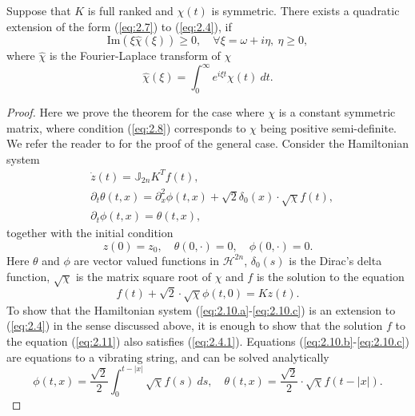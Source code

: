 \begin{theorem}
Suppose that $K$ is full ranked and $\chi(t)$ is symmetric. There exists a quadratic extension of the form (\ref{eq:2.7}) to (\ref{eq:2.4}), if
\begin{equation} \label{eq:2.8}
	\text{Im}(\xi\hat{\chi}(\xi)) \geq 0, \quad \forall \xi = \omega + i\eta, \ \eta \geq 0,
\end{equation}
where $\hat{\chi}$ is the Fourier-Laplace transform of $\chi$
\begin{equation} \label{eq:2.9}
	\hat{\chi}(\xi) = \int_0^\infty e^{i\xi t} \chi(t)\ dt.
\end{equation}
\end{theorem}

\begin{proof}
Here we prove the theorem for the case where $\chi$ is a constant symmetric matrix, where condition (\ref{eq:2.8}) corresponds to $\chi$ being positive semi-definite. We refer the reader to \cite{Figotin:2006jy} for the proof of the general case. Consider the Hamiltonian system
\begin{subequations}
\begin{align}
		\label{eq:2.10.a} & \dot{z}(t) = \mathbb J_{2n} K^T f(t), \\
		\label{eq:2.10.b} & \partial_t \theta(t,x) = \partial_x^2 \phi(t,x) + \sqrt 2 \delta_0(x) \cdot \sqrt{\chi}  f(t), \\
		\label{eq:2.10.c} & \partial_t \phi(t,x) = \theta(t,x),
\end{align}
\end{subequations}
together with the initial condition
\begin{equation} \label{eq:2.10.1}
	z(0) = z_0,\quad \theta(0,\cdot) = 0, \quad \phi(0,\cdot) = 0.
\end{equation}
Here $\theta$ and $\phi$ are vector valued functions in $\mathcal H^{2n}$, $\delta_0(s)$ is the Dirac's delta function, $\sqrt{ \chi}$ is the matrix square root of $\chi$ and $f$ is the solution to the equation
\begin{equation} \label{eq:2.11}
	f(t) + \sqrt{2} \cdot \sqrt{ \chi } \phi(t,0) = Kz(t).
\end{equation}
To show that the Hamiltonian system (\ref{eq:2.10.a}-\ref{eq:2.10.c}) is an extension to (\ref{eq:2.4}) in the sense discussed above, it is enough to show that the solution $f$ to the equation (\ref{eq:2.11}) also satisfies (\ref{eq:2.4.1}). Equations (\ref{eq:2.10.b}-\ref{eq:2.10.c}) are equations to a vibrating string, and can be solved analytically
\begin{equation} \label{eq:2.12}
	\phi(t,x) = \frac {\sqrt 2} 2 \int_0^{t-|x|} \sqrt{\chi} f(s)\ ds,\quad \theta(t,x) = \frac{\sqrt 2}{2} \cdot \sqrt{\chi} f(t - |x|).
\end{equation}
\end{proof}
